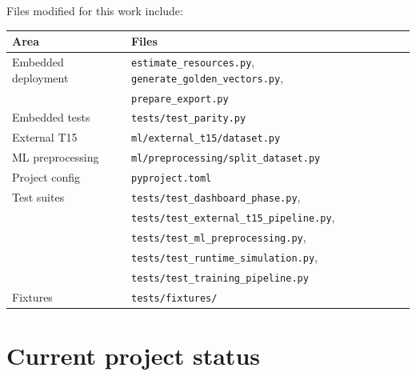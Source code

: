 \documentclass[11pt,a4paper]{article}
\begin{document}
\noindent Files modified for this work include:

\begin{center}
\begin{tabular}{ll}
\toprule
\textbf{Area} & \textbf{Files} \\
\midrule
Embedded deployment  & \texttt{estimate\_resources.py}, \texttt{generate\_golden\_vectors.py}, \\
                     & \texttt{prepare\_export.py} \\
Embedded tests       & \texttt{tests/test\_parity.py} \\
External T15         & \texttt{ml/external\_t15/dataset.py} \\
ML preprocessing     & \texttt{ml/preprocessing/split\_dataset.py} \\
Project config       & \texttt{pyproject.toml} \\
Test suites          & \texttt{tests/test\_dashboard\_phase.py}, \\
                     & \texttt{tests/test\_external\_t15\_pipeline.py}, \\
                     & \texttt{tests/test\_ml\_preprocessing.py}, \\
                     & \texttt{tests/test\_runtime\_simulation.py}, \\
                     & \texttt{tests/test\_training\_pipeline.py} \\
Fixtures             & \texttt{tests/fixtures/} \\
\bottomrule
\end{tabular}
\end{center}

\section{Current project status}
\end{document}
